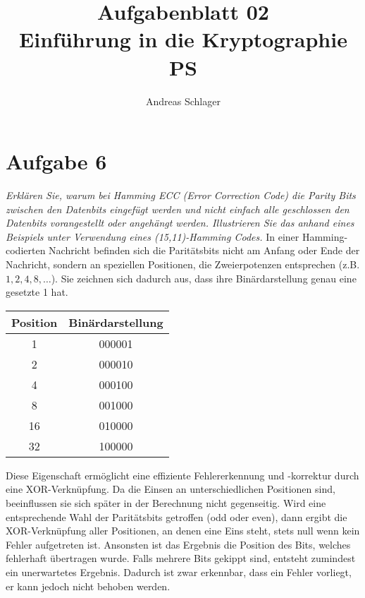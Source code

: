 \documentclass{article}
\title{{\Huge Aufgabenblatt 02}\\Einführung in die Kryptographie PS}
\author{Andreas Schlager}
\begin{document}
    \maketitle
    \section{Aufgabe 6}
    \textit{Erklären Sie, warum bei Hamming ECC (Error Correction Code) die Parity Bits zwischen den Datenbits
    eingefügt werden und nicht einfach alle geschlossen den Datenbits vorangestellt oder
    angehängt werden. Illustrieren Sie das anhand eines Beispiels unter Verwendung
    eines (15,11)-Hamming Codes.}\vspace*{1em}\newline
    In einer Hamming-codierten Nachricht befinden sich die Paritätsbits nicht am Anfang oder Ende der Nachricht, 
    sondern an speziellen Positionen, die Zweierpotenzen entsprechen (z.B. $1, 2, 4, 8, \dots$).
    Sie zeichnen sich dadurch aus, dass ihre Binärdarstellung genau eine gesetzte 1 hat.
    \begin{center}
        \begin{tabular}{c|c} 
            \textbf{Position} & \textbf{Binärdarstellung}\\\hline
            1 & 000001\\
            2 & 000010\\
            4 & 000100\\
            8 & 001000\\
            16 & 010000\\
            32 & 100000
        \end{tabular}
    \end{center}
    Diese Eigenschaft ermöglicht eine effiziente Fehlererkennung und -korrektur durch eine XOR-Verknüpfung.
    Da die Einsen an unterschiedlichen Positionen sind, beeinflussen sie sich später in der Berechnung nicht gegenseitig.
    Wird eine entsprechende Wahl der Paritätsbits getroffen (odd oder even), dann ergibt die XOR-Verknüpfung 
    aller Positionen, an denen eine Eins steht, stets null wenn kein Fehler aufgetreten ist. Ansonsten ist das 
    Ergebnis die Position des Bits, welches fehlerhaft übertragen wurde. Falls mehrere Bits gekippt sind, 
    entsteht zumindest ein unerwartetes Ergebnis. Dadurch ist zwar erkennbar, dass ein Fehler vorliegt, 
    er kann jedoch nicht behoben werden.
\end{document}
